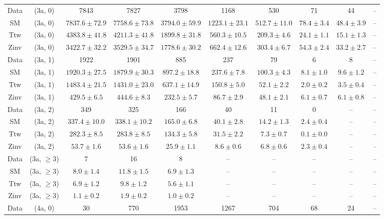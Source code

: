 \begin{table}[h!]
{\begin{tabular}{cccccccccc}
	Data & (3a, 0) & 7843 & 7827 & 3798 & 1168 & 530 & 71 & 44 & -- \\[0.5ex] 
	SM & (3a, 0) & $7837.6\pm 72.9$ & $7758.6\pm 73.8$ & $3794.0\pm 59.9$ & $1223.1\pm 23.1$ & $512.7\pm 11.0$ & $78.4\pm 3.4$ & $48.4\pm 3.9$ & -- \\[0.5ex] 
	Ttw & (3a, 0) & $4383.8\pm 41.8$ & $4211.3\pm 41.8$ & $1899.8\pm 31.8$ & $560.3\pm 10.5$ & $209.3\pm 4.6$ & $24.1\pm 1.1$ & $15.1\pm 1.3$ & -- \\[0.5ex] 
	Zinv & (3a, 0) & $3422.7\pm 32.2$ & $3529.5\pm 34.7$ & $1778.6\pm 30.2$ & $662.4\pm 12.6$ & $303.4\pm 6.7$ & $54.3\pm 2.4$ & $33.2\pm 2.7$ & -- \\[0.5ex] 
	Data & (3a, 1) & 1922 & 1901 & 885 & 237 & 79 & 6 & 8 & -- \\[0.5ex] 
	SM & (3a, 1) & $1920.3\pm 27.5$ & $1879.9\pm 30.3$ & $897.2\pm 18.8$ & $237.6\pm 7.8$ & $100.3\pm 4.3$ & $8.1\pm 1.0$ & $9.6\pm 1.2$ & -- \\[0.5ex] 
	Ttw & (3a, 1) & $1483.4\pm 21.5$ & $1431.0\pm 23.0$ & $637.1\pm 14.9$ & $150.8\pm 5.0$ & $52.1\pm 2.2$ & $2.0\pm 0.2$ & $3.5\pm 0.4$ & -- \\[0.5ex] 
	Zinv & (3a, 1) & $429.5\pm 6.5$ & $444.6\pm 8.3$ & $232.5\pm 5.7$ & $86.7\pm 2.9$ & $48.1\pm 2.1$ & $6.1\pm 0.7$ & $6.1\pm 0.8$ & -- \\[0.5ex] 
	Data & (3a, 2) & 349 & 325 & 166 & 40 & 11 & 0 & -- & -- \\[0.5ex] 
	SM & (3a, 2) & $337.4\pm 10.0$ & $338.1\pm 10.2$ & $165.0\pm 6.8$ & $40.1\pm 2.8$ & $14.2\pm 1.3$ & $2.4\pm 0.4$ & -- & -- \\[0.5ex] 
	Ttw & (3a, 2) & $282.3\pm 8.5$ & $283.8\pm 8.5$ & $134.3\pm 5.8$ & $31.5\pm 2.2$ & $7.3\pm 0.7$ & $0.1\pm 0.0$ & -- & -- \\[0.5ex] 
	Zinv & (3a, 2) & $53.7\pm 1.6$ & $53.6\pm 1.6$ & $25.9\pm 1.1$ & $8.6\pm 0.6$ & $6.8\pm 0.6$ & $2.3\pm 0.4$ & -- & -- \\[0.5ex] 
	Data & (3a, $\ge3$) & 7 & 16 & 8 & -- & -- & -- & -- & -- \\[0.5ex] 
	SM & (3a, $\ge3$) & $8.0\pm 1.4$ & $11.8\pm 1.5$ & $6.9\pm 1.3$ & -- & -- & -- & -- & -- \\[0.5ex] 
	Ttw & (3a, $\ge3$) & $6.9\pm 1.2$ & $9.8\pm 1.2$ & $5.6\pm 1.1$ & -- & -- & -- & -- & -- \\[0.5ex] 
	Zinv & (3a, $\ge3$) & $1.1\pm 0.2$ & $1.9\pm 0.2$ & $1.0\pm 0.2$ & -- & -- & -- & -- & -- \\[0.5ex] 
	Data & (4a, 0) & 30 & 770 & 1953 & 1267 & 704 & 68 & 24 & -- \\[0.5ex] 

\end{tabular}}
\end{table}
